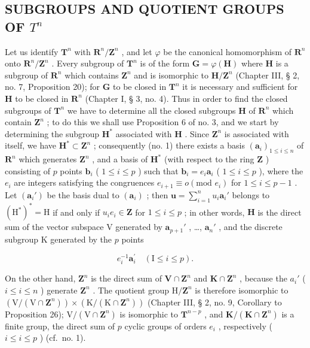 \subsection{\texorpdfstring{SUBGROUPS AND QUOTIENT GROUPS OF \(T^{n}\)}{SUBGROUPS AND QUOTIENT GROUPS OF T TO THE N}}

Let us identify \(\mathbf{T}^n\) with \(\mathbf{R}^n/\mathbf{Z}^n\) , and let \(\varphi\) be the canonical homomorphism of \(\mathbf{R}^n\) onto \(\mathbf{R}^n/\mathbf{Z}^n\) . Every subgroup of \(\mathbf{T}^n\) is of the form \(\mathbf{G} = \varphi(\mathbf{H})\) where \(\mathbf{H}\) is a subgroup of \(\mathbf{R}^n\) which contains \(\mathbf{Z}^n\) and is isomorphic to \(\mathbf{H}/\mathbf{Z}^n\) (Chapter III, § 2, no. 7, Proposition 20); for \(\mathbf{G}\) to be closed in \(\mathbf{T}^n\) it is necessary and sufficient for \(\mathbf{H}\) to be closed in \(\mathbf{R}^n\) (Chapter I, § 3, no. 4). Thus in order to find the closed subgroups of \(\mathbf{T}^n\) we have to determine all the closed subgroups \(\mathbf{H}\) of \(\mathbf{R}^n\) which contain \(\mathbf{Z}^n\) ; to do this we shall use Proposition 6 of no. 3, and we start by determining the subgroup \(\mathbf{H}^*\) associated with \(\mathbf{H}\) . Since \(\mathbf{Z}^n\) is associated with itself, we have \(\mathbf{H}^* \subset \mathbf{Z}^n\) ; consequently (no. 1) there exists a basis \((\boldsymbol{a}_i)_{1 \leqslant i \leqslant n}\) of \(\mathbf{R}^n\) which generates \(\mathbf{Z}^n\) , and a basis of \(\mathbf{H}^*\) (with respect to the ring \(\mathbf{Z}\) ) consisting of \(p\) points \(\boldsymbol{b}_i\) ( \(1 \leqslant i \leqslant p\) ) such that \(\boldsymbol{b}_i = e_i \boldsymbol{a}_i\) ( \(1 \leqslant i \leqslant p\) ), where the \(e_i\) are integers satisfying the congruences \(e_{i+1} \equiv o (\text{mod } e_i)\) for \(1 \leqslant i \leqslant p - 1\) . Let \((\boldsymbol{a}_i')\) be the basis dual to \((\boldsymbol{a}_i)\) ; then \(\boldsymbol{u} = \sum_{i=1}^{n} u_i \boldsymbol{a}_i'\) belongs to \((\mathrm{H}^*)^* = \mathrm{H}\) if and only if \(u_i e_i \in \mathbf{Z}\) for \(1 \leqslant i \leqslant p\) ; in other words, \(\mathbf{H}\) is the direct sum of the vector subspace V generated by \(\boldsymbol{a}_{p+1}'\) , \ldots, \(\boldsymbol{a}_n'\) , and the discrete subgroup K generated by the \(p\) points

\[
e _ {i} ^ {- 1} \boldsymbol {a} _ {i} ^ {\prime} \quad (\mathrm{I} \leqslant i \leqslant p).
\]

On the other hand, \(\mathbf{Z}^n\) is the direct sum of \(\mathbf{V} \cap \mathbf{Z}^n\) and \(\mathbf{K} \cap \mathbf{Z}^n\) , because the \(a_i'\) ( \(i \leqslant i \leqslant n\) ) generate \(\mathbf{Z}^n\) . The quotient group \(\mathrm{H} / \mathbf{Z}^n\) is therefore isomorphic to \((\mathrm{V} / (\mathrm{V} \cap \mathbf{Z}^n)) \times (\mathrm{K} / (\mathrm{K} \cap \mathbf{Z}^n))\) (Chapter III, § 2, no. 9, Corollary to Proposition 26); \(\mathrm{V} / (\mathrm{V} \cap \mathbf{Z}^n)\) is isomorphic to \(\mathbf{T}^{n-p}\) , and \(\mathbf{K} / (\mathbf{K} \cap \mathbf{Z}^n)\) is a finite group, the direct sum of \(p\) cyclic groups of orders \(e_i\) , respectively ( \(i \leqslant i \leqslant p\) ) (cf.~no. 1).

